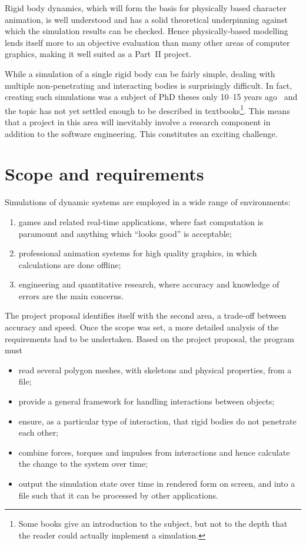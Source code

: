 Rigid body dynamics, which will form the basis for physically based character animation, is well
understood and has a solid theoretical underpinning against which the simulation results can be
checked. Hence physically-based modelling lends itself more to an objective evaluation than
many other areas of computer graphics, making it well suited as a Part~II project.

While a simulation of a single rigid body can be fairly simple, dealing with multiple
non-penetrating and interacting bodies is surprisingly difficult. In fact, creating such
simulations was a subject of PhD theses only 10--15 years
ago~\cite{Baraff:PhD,Mirtich:PhD,Saunders:PhD} and the topic has not yet settled enough to be
described in textbooks\footnote{Some books \cite{Shabana:01,Eberly:04} give an introduction to
the subject, but not to the depth that the reader could actually implement a simulation.}. This
means that a project in this area will inevitably involve a research component in addition to
the software engineering. This constitutes an exciting challenge.

\section{Scope and requirements}

Simulations of dynamic systems are employed in a wide range of environments:
\begin{enumerate}
\item games and related real-time applications, where fast computation is paramount and anything
    which ``looks good'' is acceptable;
\item professional animation systems for high quality graphics, in which calculations are done
    offline;
\item engineering and quantitative research, where accuracy and knowledge of errors are the main
    concerns.
\end{enumerate}

The project proposal identifies itself with the second area, a trade-off between accuracy and
speed. Once the scope was set, a more detailed analysis of the requirements had to be undertaken.
Based on the project proposal, the program must
\begin{itemize}
\item read several polygon meshes, with skeletons and physical properties, from a file;
\item provide a general framework for handling interactions between objects;
\item ensure, as a particular type of interaction, that rigid bodies do not penetrate each other;
\item combine forces, torques and impulses from interactions and hence calculate the change to
    the system over time;
\item output the simulation state over time in rendered form on screen, and into a file such that
    it can be processed by other applications.
\end{itemize}

